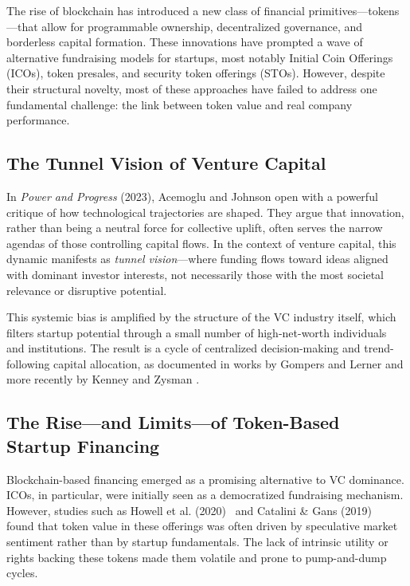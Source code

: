 \documentclass[conference]{IEEEtran}
\begin{document}
The rise of blockchain has introduced a new class of financial primitives—tokens—that allow for programmable ownership, decentralized governance, and borderless capital formation. These innovations have prompted a wave of alternative fundraising models for startups, most notably Initial Coin Offerings (ICOs), token presales, and security token offerings (STOs). However, despite their structural novelty, most of these approaches have failed to address one fundamental challenge: the link between token value and real company performance.

\subsection{The Tunnel Vision of Venture Capital}

In \textit{Power and Progress} (2023), Acemoglu and Johnson open with a powerful critique of how technological trajectories are shaped. They argue that innovation, rather than being a neutral force for collective uplift, often serves the narrow agendas of those controlling capital flows. In the context of venture capital, this dynamic manifests as \textit{tunnel vision}—where funding flows toward ideas aligned with dominant investor interests, not necessarily those with the most societal relevance or disruptive potential.

This systemic bias is amplified by the structure of the VC industry itself, which filters startup potential through a small number of high-net-worth individuals and institutions. The result is a cycle of centralized decision-making and trend-following capital allocation, as documented in works by Gompers and Lerner \cite{gompers2004venture} and more recently by Kenney and Zysman \cite{kenney2019platform}.

\subsection{The Rise—and Limits—of Token-Based Startup Financing}
Blockchain-based financing emerged as a promising alternative to VC dominance. ICOs, in particular, were initially seen as a democratized fundraising mechanism. However, studies such as Howell et al. (2020)~\cite{howell2020initial} and Catalini \& Gans (2019)~\cite{catalini2019some} found that token value in these offerings was often driven by speculative market sentiment rather than by startup fundamentals. The lack of intrinsic utility or rights backing these tokens made them volatile and prone to pump-and-dump cycles.
\end{document}
